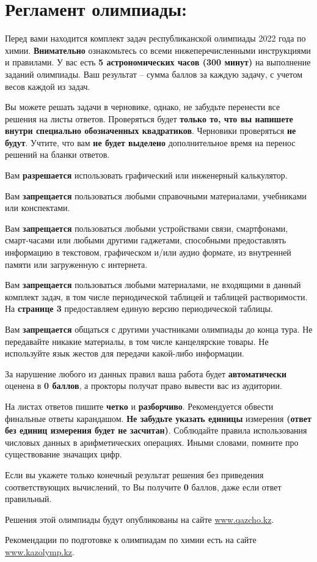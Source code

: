 \section*{ Регламент олимпиады:}

Перед вами находится комплект задач республиканской олимпиады 2022 года по химии. \textbf{Внимательно} ознакомьтесь со всеми нижеперечисленными инструкциями и правилами. У вас есть \textbf{5 астрономических часов (300 минут)} на выполнение заданий олимпиады. Ваш результат – сумма баллов за каждую задачу, с учетом весов каждой из задач.

Вы можете решать задачи в черновике, однако, не забудьте перенести все решения на листы ответов. Проверяться будет \textbf{только то, что вы напишете внутри специально обозначенных квадратиков}. Черновики проверяться \textbf{не будут}. Учтите, что вам \textbf{не будет выделено} дополнительное время на перенос решений на бланки ответов.

Вам \textbf{разрешается} использовать графический или инженерный калькулятор.

Вам \textbf{запрещается} пользоваться любыми справочными материалами, учебниками или конспектами.

Вам \textbf{запрещается} пользоваться любыми устройствами связи, смартфонами, смарт-часами или любыми другими гаджетами, способными предоставлять информацию в текстовом, графическом и/или аудио формате, из внутренней памяти или загруженную с интернета.

Вам \textbf{запрещается} пользоваться любыми материалами, не входящими в данный комплект задач, в том числе периодической таблицей и таблицей растворимости. На \textbf{странице 3} предоставляем единую версию периодической таблицы.

Вам \textbf{запрещается} общаться с другими участниками олимпиады до конца тура. Не передавайте никакие материалы, в том числе канцелярские товары. Не используйте язык жестов для передачи какой-либо информации.

За нарушение любого из данных правил ваша работа будет \textbf{автоматически} оценена в \textbf{0 баллов}, а прокторы получат право вывести вас из аудитории.

На листах ответов пишите \textbf{четко} и \textbf{разборчиво}. Рекомендуется обвести финальные ответы карандашом. \textbf{Не забудьте указать единицы} измерения \textbf{(ответ без единиц измерения будет не засчитан)}. Соблюдайте правила использования числовых данных в арифметических операциях. Иными словами, помните про существование значащих цифр.

Если вы укажете только конечный результат решения без приведения соответствующих вычислений, то Вы получите \textbf{0} баллов, даже если ответ правильный.

Решения этой олимпиады будут опубликованы на сайте \href{https://qazcho.kz}{www.qazcho.kz}.

Рекомендации по подготовке к олимпиадам по химии есть на сайте \href{https://kazolymp.kz}{www.kazolymp.kz}.
